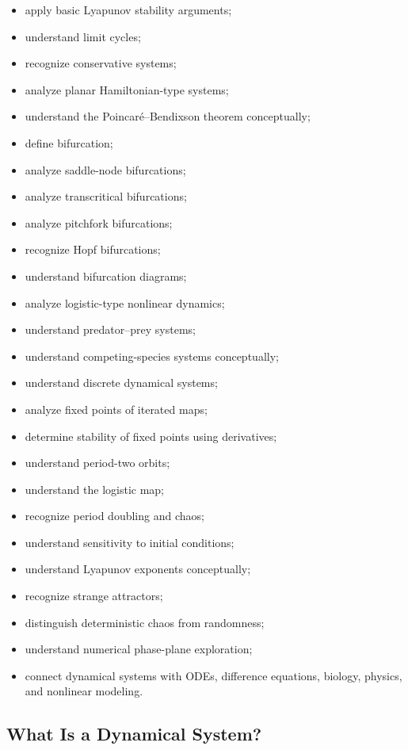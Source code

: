 {\begin{itemize}
    \item apply basic Lyapunov stability arguments;
    \item understand limit cycles;
    \item recognize conservative systems;
    \item analyze planar Hamiltonian-type systems;
    \item understand the Poincaré--Bendixson theorem conceptually;
    \item define bifurcation;
    \item analyze saddle-node bifurcations;
    \item analyze transcritical bifurcations;
    \item analyze pitchfork bifurcations;
    \item recognize Hopf bifurcations;
    \item understand bifurcation diagrams;
    \item analyze logistic-type nonlinear dynamics;
    \item understand predator--prey systems;
    \item understand competing-species systems conceptually;
    \item understand discrete dynamical systems;
    \item analyze fixed points of iterated maps;
    \item determine stability of fixed points using derivatives;
    \item understand period-two orbits;
    \item understand the logistic map;
    \item recognize period doubling and chaos;
    \item understand sensitivity to initial conditions;
    \item understand Lyapunov exponents conceptually;
    \item recognize strange attractors;
    \item distinguish deterministic chaos from randomness;
    \item understand numerical phase-plane exploration;
    \item connect dynamical systems with ODEs, difference equations,
          biology, physics, and nonlinear modeling.
\end{itemize}
}

\subsection{What Is a Dynamical System?}
\label{subsec:what-is-dynamical-system}

